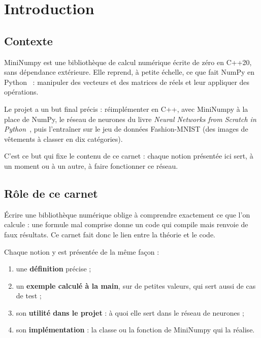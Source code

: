 
\chapter{Introduction}
\label{chap-introduction}

\section{Contexte}

MiniNumpy est une bibliothèque de calcul numérique
écrite de zéro en C++20, sans dépendance extérieure.
Elle reprend, à petite échelle, ce que fait NumPy
en Python~\cite{numpy} : manipuler des vecteurs et
des matrices de réels et leur appliquer des
opérations.

Le projet a un but final précis : réimplémenter en
C++, avec MiniNumpy à la place de NumPy, le réseau
de neurones du livre \emph{Neural Networks from
Scratch in Python}~\cite{nnfs}, puis l'entraîner sur
le jeu de données Fashion-MNIST (des images de
vêtements à classer en dix catégories).

C'est ce but qui fixe le contenu de ce carnet :
chaque notion présentée ici sert, à un moment ou
à un autre, à faire fonctionner ce réseau.

\section{Rôle de ce carnet}

Écrire une bibliothèque numérique oblige à
comprendre exactement ce que l'on calcule : une
formule mal comprise donne un code qui compile mais
renvoie de faux résultats. Ce carnet fait donc le
lien entre la théorie et le code.

Chaque notion y est présentée de la même façon :
\begin{enumerate}
    \item une \textbf{définition} précise ;
    \item un \textbf{exemple calculé à la main}, sur
          de petites valeurs, qui sert aussi de cas
          de test ;
    \item son \textbf{utilité dans le projet} :
          à quoi elle sert dans le réseau de
          neurones ;
    \item son \textbf{implémentation} : la classe
          ou la fonction de MiniNumpy qui la
          réalise.
\end{enumerate}

